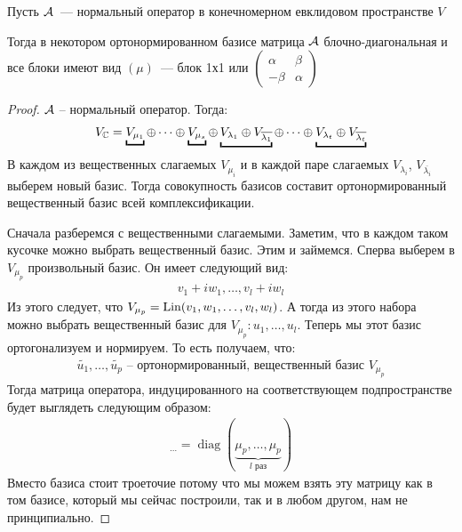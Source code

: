 \begin{theorem}
    Пусть $\mathcal{A}$~--- нормальный оператор в конечномерном евклидовом пространстве $V$ 
       
    Тогда в некотором ортонормированном базисе матрица $\mathcal{A}$ блочно-диагональная и все блоки имеют вид $(\mu)$~--- блок 1х1 или $\left(\begin{array}{cc}
        \alpha & \beta \\ 
        -\beta & \alpha
        \end{array}\right)$
\begin{proof}
    $\mathcal{A}$ -- нормальный оператор. Тогда:
    \begin{gather*}
        V_{\C} = \underbracket{V_{\mu_1}} \oplus \dots \oplus \underbracket{V_{\mu_s}} \oplus \underbracket{V_{\lambda_1} \oplus V_{\overline{\lambda_1}}} \oplus \dots \oplus \underbracket{V_{\lambda_t} \oplus V_{\overline{\lambda_t}}}
    \end{gather*}
    В каждом из вещественных слагаемых $V_{\mu_i}$ и в каждой паре слагаемых $V_{\lambda_i}$, $V_{\overline{\lambda_i}}$ выберем новый базис. 
    Тогда совокупность базисов составит ортонормированный вещественный базис всей комплексификации.
    
    Сначала разберемся с вещественными слагаемыми.
    Заметим, что в каждом таком кусочке можно выбрать вещественный базис.
    Этим и займемся. 
    Сперва выберем в $V_{\mu_p}$ произвольный базис. Он имеет следующий вид:
    \begin{gather*}
        v_1 + iw_1, \dots, v_l + i w_l
    \end{gather*}
    Из этого следует, что $V_{\mu_p} = \operatorname{Lin} (v_1, w_1, \dots, v_l, w_l)$. А тогда
    из этого набора можно выбрать вещественный базис для $V_{\mu_p}: u_1, \dots, u_l$. 
    Теперь мы этот базис ортогонализуем и нормируем. То есть получаем, что:
    \begin{gather*}
        \widetilde{u_1}, \dots, \widetilde{u_p} \text{ -- ортонормированный, вещественный базис } V_{\mu_p}
    \end{gather*}
    Тогда матрица оператора, индуцированного на соответствующем подпространстве будет выглядеть следующим образом: 
    \begin{gather*}
        [\A \, |_{V_{\mu_p} }]_{\dots} = \operatorname{diag} (\underbrace{\mu_p, \dots, \mu_p}_{\text{$l$ раз}})
    \end{gather*}
    Вместо базиса стоит троеточие потому что мы можем взять эту матрицу как в том базисе, который мы сейчас построили, так 
    и в любом другом, нам не принципиально. 


\end{proof}
\end{theorem}
